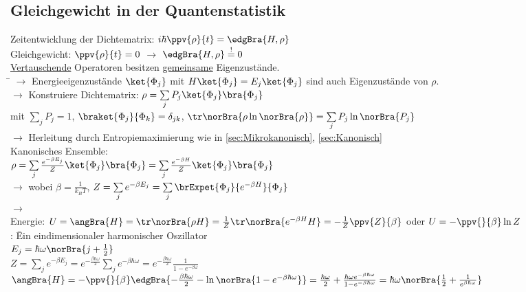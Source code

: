 \subsection{Gleichgewicht in der Quantenstatistik}
\begin{tabbing}
Zeitentwicklung der Dichtematrix: $i \hbar \ppv{\rho}{t} = \edgBra{H,\rho}$\\
Gleichgewicht: $\ppv{\rho}{t} = 0$ $\rightarrow$ $\edgBra{H,\rho} \stackrel{!}{=} 0$\\
\uline{Vertauschende} Operatoren besitzen \uline{gemeinsame} Eigenzustände.\\
\hspace{4em} \= \kill
$\rightarrow$\> Energieeigenzustände $\ket{\Phi_j}$ mit $H \ket{\Phi_j} = E_j \ket{\Phi_j}$ sind auch Eigenzustände von $\rho$.\\
$\rightarrow$\> Konstruiere Dichtematrix: $\rho = \sum\limits_j P_j \ket{\Phi_j}\bra{\Phi_j}$\\\> mit $\sum\limits_j P_j = 1$, $\braket{\Phi_j}{\Phi_k} = \delta_{jk}$, $\tr\norBra{\rho\ln\norBra{\rho}} = \sum\limits_j P_j \ln\norBra{P_j}$\\
$\rightarrow$\> Herleitung durch Entropiemaximierung wie in \ref{sec:Mikrokanonisch}, \ref{sec:Kanonisch}\\
Kanonisches Ensemble:\\
\> $\rho = \sum\limits_j \frac{e^{-\beta E_j}}{Z} \ket{\Phi_j}\bra{\Phi_j} = \sum\limits_j \frac{e^{-\beta H}}{Z} \ket{\Phi_j}\bra{\Phi_j}$\\
$\rightarrow$\>  wobei $\beta = \frac{1}{k_B T}$, $Z = \sum\limits_j e^{-\beta E_j} = \sum\limits_j \brExpet{\Phi_j}{e^{-\beta H}}{\Phi_j}$\\
$\rightarrow$\> \\
Energie: $U = \angBra{H} = \tr\norBra{\rho H} = \frac{1}{Z} \tr\norBra{e^{-\beta H} H} = - \frac{1}{Z} \ppv{Z}{\beta}$ oder $U = - \ppv{}{\beta} \ln Z$\\
: \= Ein eindimensionaler harmonischer Oszillator\\
\> $E_j = \hbar\omega \norBra{j + \frac{1}{2}}$\\
\> $Z = \sum\limits_j e^{-\beta E_j} = e^{-\frac{\beta\hbar\omega}{2}} \sum\limits_j e^{-\beta\hbar\omega} = e^{-\frac{\beta\hbar\omega}{2}} \frac{1}{1-e^{-\beta\omega}}$\\
$\angBra{H} = -\ppv{}{\beta}\edgBra{-\frac{\beta\hbar\omega}{2} - \ln\norBra{1 - e^{-\beta\hbar\omega}}} = \frac{\hbar\omega}{2} + \frac{\hbar\omega e^{-\beta\hbar\omega}}{1 - e^{-\beta\hbar\omega}} = \hbar\omega\norBra{\frac12 + \frac{1}{e^{\beta\hbar\omega}}}$
\end{tabbing}


